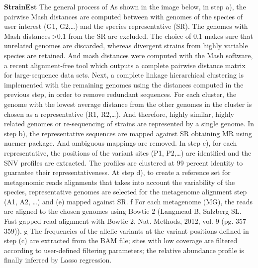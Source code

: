 \textbf{StrainEst} The general process of As shown in the image below, in step a), the pairwise Mash distances are computed between with genomes of the species of user interest (G1, G2,…) and the species representative (SR). The genomes with Mash distances >0.1 from the SR are excluded. The choice of 0.1 makes sure that unrelated genomes are discarded, whereas divergent strains from highly variable species are retained. And mash distances were computed with the Mash software, a recent alignment-free tool which outputs a complete pairwise distance matrix for large-sequence data sets. Next, a complete linkage hierarchical clustering is implemented with the remaining genomes using the distances computed in the previous step, in order to remove redundant sequences. For each cluster, the genome with the lowest average distance from the other genomes in the cluster is chosen as a representative (R1, R2,…). And therefore, highly similar, highly related genomes or re-sequencing of strains are represented by a single genome. In step b), the representative sequences are mapped against SR obtaining MR using nucmer package. And ambiguous mappings are removed. In step c), for each representative, the positions of the variant sites (P1, P2,…) are identified and the SNV profiles are extracted. The profiles are clustered at 99 percent identity to guarantee their representativeness. At step d), to create a reference set for metagenomic reads alignments that takes into account the variability of the species, representative genomes are selected for the metagenome alignment step (A1, A2, …) and (e) mapped against SR. f For each metagenome (MG), the reads are aligned to the chosen genomes using Bowtie 2 (Langmead B,  Salzberg SL. Fast gapped-read alignment with Bowtie 2, Nat. Methods, 2012, vol. 9 (pg. 357-359)). g The frequencies of the allelic variants at the variant positions defined in step (c) are extracted from the BAM file; sites with low coverage are filtered according to user-defined filtering parameters; the relative abundance profile is finally inferred by Lasso regression.  \cite{Albanese2017} 

